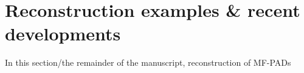 \section{Reconstruction examples & recent developments}

In this section/the remainder of the manuscript, reconstruction of MF-PADs 